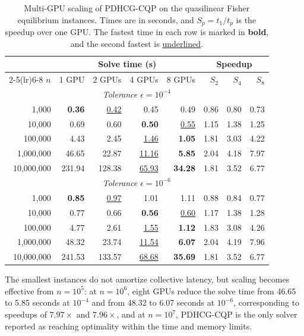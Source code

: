\documentclass[letterpaper]{article} %
\newcommand{\name}{PDHCG-CQP\xspace}
\theoremstyle{definition}
\theoremstyle{remark}
\newcommand{\papertablesetup}{\small\setstretch{1.0}\renewcommand{\arraystretch}{1.2}}
\begin{document}
\begin{table}[htbp]
    \centering
  \papertablesetup
    \caption{Multi-GPU scaling of \name on the quasilinear Fisher equilibrium
    instances. Times are in seconds, and $S_p=t_1/t_p$ is the speedup over one GPU. The fastest time in
    each row is marked in \textbf{bold}, and the second fastest is
    \underline{underlined}.}
    \label{tab:fisher-scaling}
    \medskip
    \begin{tabular}{rrrrrrrr}
        \toprule
        & \multicolumn{4}{c}{Solve time (s)}
        & \multicolumn{3}{c}{Speedup}\\
        \cmidrule(lr){2-5}\cmidrule(lr){6-8}
        $n$ & 1 GPU & 2 GPUs & 4 GPUs & 8 GPUs
            & $S_2$ & $S_4$ & $S_8$\\
        \midrule
        \multicolumn{8}{c}{\textit{Tolerance $\epsilon=10^{-4}$}}\\
        \midrule
        1,000      & \textbf{0.36} & \underline{0.42} & 0.45 & 0.49 & 0.86 & 0.80 & 0.73\\
        10,000     & 0.69 & 0.60 & \textbf{0.50} & \underline{0.55} & 1.15 & 1.38 & 1.25\\
        100,000    & 4.43 & 2.45 & \underline{1.46} & \textbf{1.05} & 1.81 & 3.03 & 4.22\\
        1,000,000  & 46.65 & 22.87 & \underline{11.16} & \textbf{5.85} & 2.04 & 4.18 & 7.97\\
        10,000,000 & 231.94 & 128.38 & \underline{65.93} & \textbf{34.28} & 1.81 & 3.52 & 6.77\\
        \midrule
        \multicolumn{8}{c}{\textit{Tolerance $\epsilon=10^{-6}$}}\\
        \midrule
        1,000      & \textbf{0.85} & \underline{0.97} & 1.01 & 1.11 & 0.88 & 0.84 & 0.77\\
        10,000     & 0.77 & 0.66 & \textbf{0.56} & \underline{0.60} & 1.17 & 1.38 & 1.28\\
        100,000    & 4.77 & 2.61 & \underline{1.55} & \textbf{1.12} & 1.83 & 3.08 & 4.26\\
        1,000,000  & 48.32 & 23.74 & \underline{11.54} & \textbf{6.07} & 2.04 & 4.19 & 7.96\\
        10,000,000 & 241.53 & 133.57 & \underline{68.68} & \textbf{35.69} & 1.81 & 3.52 & 6.77\\
        \bottomrule
    \end{tabular}
\end{table}

The smallest instances do not amortize collective latency, but scaling
becomes effective from $n=10^5$: at $n=10^6$, eight GPUs reduce the solve
time from 46.65 to 5.85 seconds at $10^{-4}$ and from 48.32 to 6.07 seconds
at $10^{-6}$, corresponding to speedups of $7.97\times$ and $7.96\times$,
and at
$n=10^7$, \name is the only solver reported as reaching optimality within the
time and memory limits.
\end{document}
